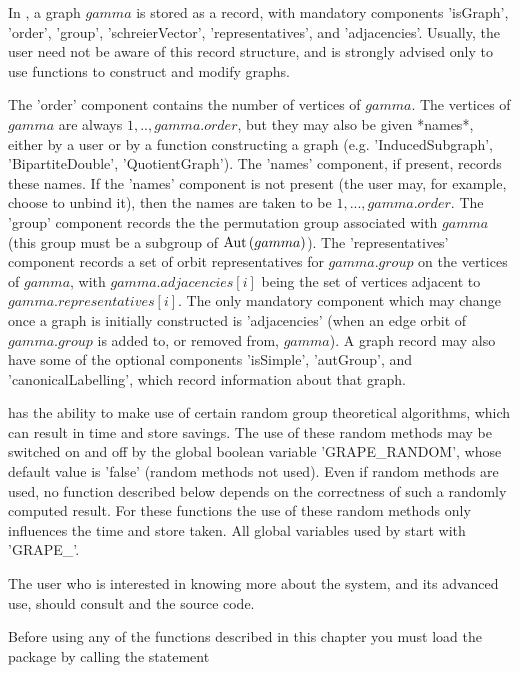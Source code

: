 In {\GRAPE},  a graph  $gamma$  is stored as   a  record,  with mandatory
components   'isGraph',    'order',        'group',     'schreierVector',
'representatives', and  'adjacencies'.   Usually, the  user  need  not be
aware  of  this record  structure,  and is  strongly  advised only to use
{\GRAPE} functions to construct and modify graphs.

The 'order' component  contains the number  of vertices of  $gamma$.  The
vertices of $gamma$  are always $1,..,gamma.order$, but  they may also be
given *names*, either  by  a  user or by  a function constructing a graph
(e.g.    'InducedSubgraph', 'BipartiteDouble',  'QuotientGraph').     The
'names' component, if  present,  records these  names.  If  the   'names'
component is  not present (the user may,  for  example, choose to  unbind
it),   then the names are taken   to be $1,...,gamma.order$.  The 'group'
component   records the  the  {\GAP}   permutation group associated  with
$gamma$  (this  group  must  be  a subgroup  of     ${\rm Aut}\,(gamma)$).   The
'representatives' component records a set  of  orbit representatives  for
$gamma.group$  on  the vertices  of  $gamma$, with $gamma.adjacencies[i]$
being the  set of vertices  adjacent to  $gamma.representatives[i]$.  The
only mandatory component  which may   change once  a graph is   initially
constructed  is 'adjacencies' (when  an  edge  orbit of $gamma.group$  is
added to, or removed from, $gamma$).  A graph  record  may also have some
of      the     optional    components   'isSimple',    'autGroup',   and
'canonicalLabelling', which record information about that graph.

{\GRAPE} has the  ability to make use of certain random group theoretical
algorithms, which can result  in time and store savings. The use of these
random methods may  be switched on and off by the global boolean variable
'GRAPE\_RANDOM',  whose  default  value  is  'false' (random  methods not
used).   Even if random methods are  used,  no function  described  below
depends  on the correctness of such a randomly computed result. For these
functions  the use of these random  methods only  influences the time and
store taken. All global variables used by {\GRAPE} start with 'GRAPE\_'.

The user who is interested in knowing more about the {\GRAPE} system, and
its advanced use,  should  consult  \cite{Soi91} and the {\GRAPE}  source
code.

Before using any of the functions described in this chapter you must load
the package by calling the statement

